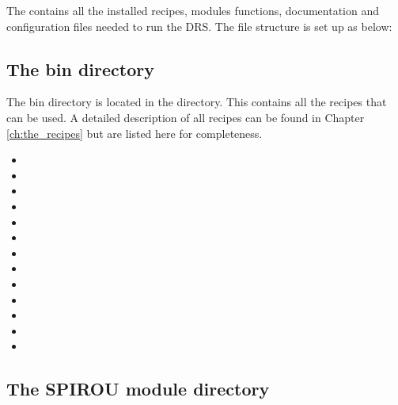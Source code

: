 The  contains all the installed recipes, modules functions, documentation and configuration files needed to run the DRS. The file structure is set up as below: 

\begin{tcustomdir}
\end{tcustomdir}

\subsection{The bin directory}
\label{ch:data_architecture:install_root_folder:bin_folder}

The bin directory is located in the  directory. This contains all the recipes that can be used. A detailed description of all recipes can be found in Chapter \ref{ch:the_recipes} but are listed here for completeness.

\begin{thighlight}
\begin{itemize}
\item \calbadpix
\item \calCCF
\item \calDARK
\item \calDRIFTRAW
\item \calDRIFTE
\item \calDRIFTPEAK
\item \calextractRAW
\item \calextractRAWAB
\item \calextractRAWC
\item \calFFraw
\item \callocRAW
\item \calSLIT
\item \calvalidate
\end{itemize}
\end{thighlight}

\ifdevguide

\subsection{The SPIROU module directory}
\label{ch:data_architecture:install_root_folder:module_folder}

